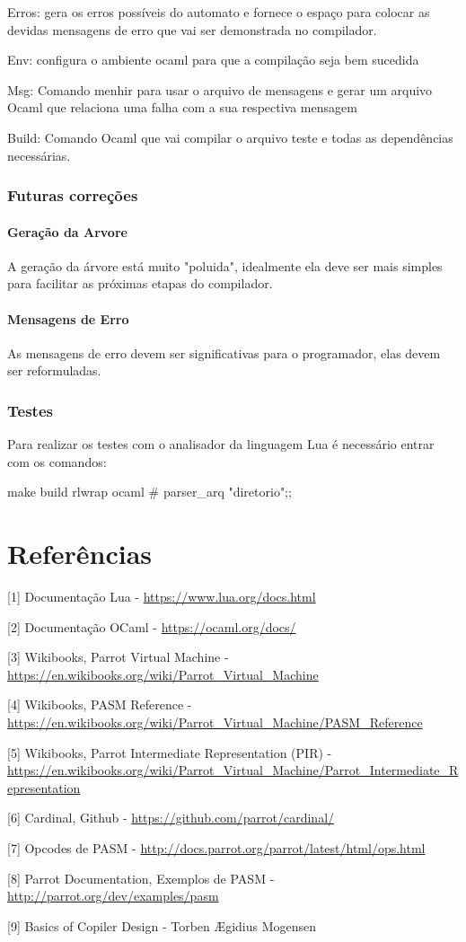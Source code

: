 \documentclass[12pt,a4paper,twoside]{report}
\begin{document}
 Erros: gera os erros possíveis do automato e fornece o espaço para colocar as devidas mensagens de erro que vai ser demonstrada no compilador.

 Env: configura o ambiente ocaml para que a compilação seja bem sucedida

 Msg: Comando menhir para usar o arquivo de mensagens e gerar um arquivo Ocaml que relaciona uma falha com a sua respectiva mensagem

 Build: Comando Ocaml que vai compilar o arquivo teste e todas as dependências necessárias.

 \subsection{Futuras correções}
 \subsubsection{Geração da Arvore}
 A geração da árvore está muito "poluida", idealmente ela deve ser mais simples para facilitar as próximas etapas do compilador.
 \subsubsection{Mensagens de Erro}
 As mensagens de erro devem ser significativas para o programador, elas devem ser reformuladas.

 \subsection{Testes}
 Para realizar os testes com o analisador da linguagem Lua é necessário entrar com os comandos:

 \begin{terminal}
make build
rlwrap ocaml
# parser_arq "diretorio";;
 \end{terminal}


\chapter{Referências}
[1] Documentação Lua - \url{https://www.lua.org/docs.html}

[2] Documentação OCaml - \url{https://ocaml.org/docs/}

[3] Wikibooks, Parrot Virtual Machine - \url{https://en.wikibooks.org/wiki/Parrot_Virtual_Machine}

[4] Wikibooks, PASM Reference - \url{https://en.wikibooks.org/wiki/Parrot_Virtual_Machine/PASM_Reference}

[5] Wikibooks, Parrot Intermediate Representation (PIR) - \url{https://en.wikibooks.org/wiki/Parrot_Virtual_Machine/Parrot_Intermediate_Representation}

[6] Cardinal, Github - \url{https://github.com/parrot/cardinal/}

[7] Opcodes de PASM - \url{http://docs.parrot.org/parrot/latest/html/ops.html}

[8] Parrot Documentation, Exemplos de PASM - \url{http://parrot.org/dev/examples/pasm}

[9] Basics of Copiler Design - Torben Ægidius Mogensen

\clearpage
{}
\appendix
\end{document}
